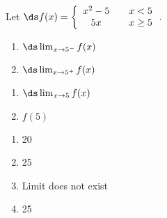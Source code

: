 {Let $\ds f(x)= \left\{\begin{array}{ccc}
x^2-5 & & x<5 \\
5x & & x \geq 5
\end{array}\right.$.

\noindent\begin{minipage}[t]{.5\linewidth}
\begin{enumerate}
\item		$\ds \lim_{x\to 5^-} f(x)$
\item		$\ds \lim_{x\to 5^+} f(x)$
\end{enumerate}
\end{minipage}
\noindent\begin{minipage}[t]{.5\linewidth}
\begin{enumerate}\addtocounter{enumii}{2}
\item		$\ds \lim_{x\to 5} f(x)$
\item		$f(5)$\end{enumerate}
\end{minipage}		
}
{\begin{enumerate}
\item		20
\item		25
\item		Limit does not exist
\item		25
\end{enumerate}
}
